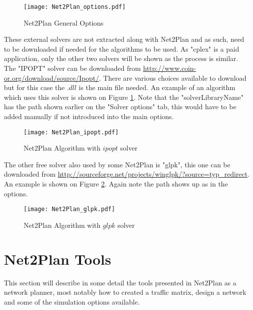 \documentclass[12pt, a4paper]{article}
\begin{document}
	\begin{figure}[h!]
		\centering
		\texttt{[image: Net2Plan\_options.pdf]}
		\caption{Net2Plan General Options}
	\end{figure}
		
	
			
	These external solvers are not extracted along with Net2Plan and as such, need to be downloaded if needed for the algorithms to be used. As "cplex" is a paid application, only the other two solvers will be shown as the process is similar.\\
		
	The "IPOPT" solver can be downloaded from \url{http://www.coin-or.org/download/source/Ipopt/}. There are various choices available to download but for this case the $.dll$ is the main file needed. An example of an algorithm which uses this solver is shown on Figure \ref{Net2Plan_ipopt}. Note that the "solverLibraryName" has the path shown earlier on the "Solver options" tab, this would have to be added manually if not introduced into the main options.
	
		
	\begin{figure}[h!]
		\centering
		\texttt{[image: Net2Plan\_ipopt.pdf]}
		\caption{Net2Plan Algorithm with $ipopt$ solver}
		\label{Net2Plan_ipopt}
	\end{figure}
				
	\vspace{-0.2cm}
		
	The other free solver also used by some Net2Plan is "glpk", this one can be downloaded from \url{http://sourceforge.net/projects/winglpk/?source=typ_redirect}. An example is shown on Figure \ref{Net2Plan_glpk}. Again note the path shows up as in the options.
		

		
	\begin{figure}[h!]
		\centering
		\texttt{[image: Net2Plan\_glpk.pdf]}
		\caption{Net2Plan Algorithm with $glpk$ solver}
		\label{Net2Plan_glpk}
	\end{figure}		
		   	
    \newpage

\section{Net2Plan Tools}
This section will describe in some detail the tools presented in Net2Plan as a network planner, most notably how to created a traffic matrix, design a network and some of the simulation options available.
\end{document}
